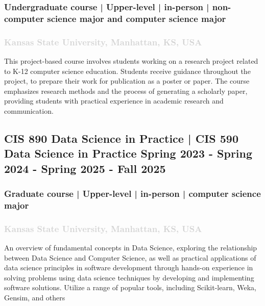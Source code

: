 \documentclass[11pt]{article}
\begin{document}
    \subsubsection{ Undergraduate course | Upper-level | in-person | non-computer science major  and computer science major   }
  \subsubsection{ \normalfont \textcolor{lightgray} {Kansas State University, Manhattan, KS, USA   }}
    \vspace{0.4em} %
   \noindent This project-based course involves students working on a research project related to K-12 computer science education. Students receive guidance throughout the project, to prepare their work for publication as a poster or paper. The course emphasizes research methods and the process of generating a scholarly paper, providing students with practical experience in academic research and communication.

\label{sec: CIS890} 
   \vspace{0.8em} %

\subsection{ CIS 890 Data Science in Practice | CIS 590 Data Science in Practice  \hfill \normalfont Spring 2023 - Spring 2024 - Spring 2025 - Fall 2025 }
    \subsubsection{ Graduate course | Upper-level | in-person | computer science major   }
  \subsubsection{ \normalfont \textcolor{lightgray} {Kansas State University, Manhattan, KS, USA   }}
  \vspace{0.4em} %
   \noindent An overview of fundamental concepts in Data Science, exploring the relationship between Data Science and Computer Science, as well as practical applications of data science principles in software development through hands-on experience in solving problems using data science techniques by developing and implementing software solutions. Utilize a range of popular tools, including Scikit-learn, Weka, Gensim, and others
\end{document}
